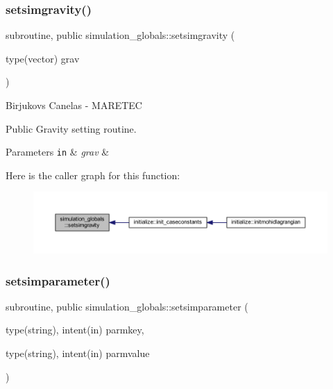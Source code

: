 \subsubsection{\texorpdfstring{setsimgravity()}{setsimgravity()}}
{\footnotesize\ttfamily subroutine, public simulation\+\_\+globals\+::setsimgravity (\begin{DoxyParamCaption}\item[{type(vector)}]{grav }\end{DoxyParamCaption})}



Birjukovs Canelas -\/ M\+A\+R\+E\+T\+EC 

Public Gravity setting routine. 
\begin{DoxyParams}[1]{Parameters}
\mbox{\tt in}  & {\em grav} & \\
\hline
\end{DoxyParams}
Here is the caller graph for this function\+:
\nopagebreak
\begin{figure}[H]
\begin{center}
\leavevmode
\includegraphics[width=350pt]{namespacesimulation__globals_abe9252e2e73b8a074700d49b705664ef_icgraph}
\end{center}
\end{figure}
\mbox{\label{namespacesimulation__globals_a7a127d09219ed57ad8db3507dbbefe5b}} 
\subsubsection{\texorpdfstring{setsimparameter()}{setsimparameter()}}
{\footnotesize\ttfamily subroutine, public simulation\+\_\+globals\+::setsimparameter (\begin{DoxyParamCaption}\item[{type(string), intent(in)}]{parmkey,  }\item[{type(string), intent(in)}]{parmvalue }\end{DoxyParamCaption})}



